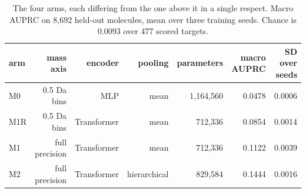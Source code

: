 \begin{table}[htbp]
\centering
\caption{The four arms, each differing from the one above it in a single respect. Macro AUPRC on 8,692 held-out molecules, mean over three training seeds. Chance is 0.0093 over 477 scored targets.}
\label{tab:table1_arms}
\begin{tabular}{l r r r r r r}
\toprule
arm & mass axis & encoder & pooling & parameters & macro AUPRC & SD over seeds \\
\midrule
M0 & 0.5 Da bins & MLP & mean & 1,164,560 & 0.0478 & 0.0006 \\
M1R & 0.5 Da bins & Transformer & mean & 712,336 & 0.0854 & 0.0014 \\
M1 & full precision & Transformer & mean & 712,336 & 0.1122 & 0.0039 \\
M2 & full precision & Transformer & hierarchical & 829,584 & 0.1444 & 0.0016 \\
\bottomrule
\end{tabular}
\end{table}
